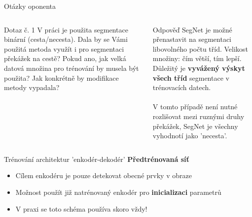 \documentclass[aspectratio=1610]{beamer}
\begin{document}
\begin{frame}{Otázky oponenta}
\begin{columns}
\begin{exampleblock}{Dotaz č. 1}
V práci je použita segmentace binární (cesta/necesta). Dala by se Vámi použitá metoda využít i pro segmentaci překážek na cestě? Pokud ano, jak velká datová množina pro trénování by musela být použita? Jak konkrétně by modifikace metody vypadala?
\end{exampleblock}

\begin{block}{Odpověď}
SegNet je možné přenastavit na segmentaci libovolného počtu tříd. Velikost množiny: čím větší, tím lepší. Důležitý je \textbf{vyvážený výskyt všech tříd} segmentace v trénovacích datech. \\~\\

V tomto případě není nutné rozlišovat mezi ruznými druhy překážek, SegNet je všechny vyhodnotí jako 'necesta'.
\end{block}
\end{columns}
\end{frame}
\begin{frame}{Trénování architektur 'enkodér-dekodér'}
\textbf{Předtrénovaná síť}
\begin{itemize}
	\item Cílem enkodéru je pouze detekovat obecné prvky v obraze
	\item Možnost použít již natrénovaný enkodér pro \textbf{inicializaci} parametrů
	\item V praxi se toto schéma používa skoro vždy!
\end{itemize}
\end{frame}
\end{document}
